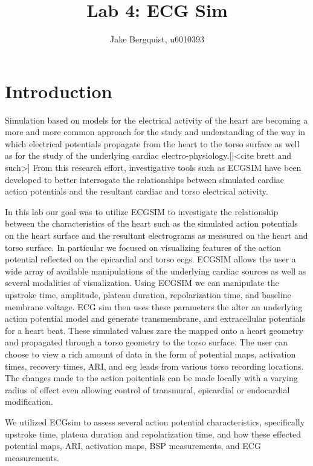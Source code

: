 \documentclass[12pt]{article}
\begin{document}
\title{Lab 4: ECG Sim}
\author{Jake Bergquist, u6010393 }
\maketitle

\section{Introduction}
\par{}
Simulation based on models for the electrical activity of the heart are becoming a more and more common approach for the study and understanding of the way in which electrical potentials propagate from the heart to the torso surface as well as for the study of the underlying cardiac electro-physiology.[|<cite brett and such>] From this research effort, investigative tools such as ECGSIM have been developed to better interrogate the relationships between simulated cardiac action potentials and the resultant cardiac and torso electrical activity. 

In this lab our goal was to utilize ECGSIM to investigate the relationship between the characteristics of the heart such as the simulated action potentials on the heart surface and the resultant electrograms as measured on the heart and torso surface. In particular we focused on visualizing features of the action potential reflected on the epicardial and torso ecgs. ECGSIM allows the user a wide array of available manipulations of the underlying cardiac sources as well as several modalities of visualization. Using ECGSIM we can manipulate the upstroke time, amplitude, plateau duration, repolarization time, and baseline membrane voltage. ECG sim then uses these parameters the alter an underlying action potential model and generate transmembrane, and extracellular potentials for a heart beat. These simulated values zare the mapped onto a heart geometry and propagated through a torso geometry to the torso surface. The user can choose to view a rich amount of data in the form of potential maps, activation times, recovery times, ARI, and ecg leads from various torso recording locations. The changes made to the action poitentials can be made locally with a varying radius of effect even allowing control of transmural, epicardial or endocardial modification.

We utilized ECGsim to assess several action potential characteristics, specifically upstroke time, plateua duration and repolarization time, and how these effected potential maps, ARI, activation maps, BSP measurements, and ECG measurements.
\end{document}
